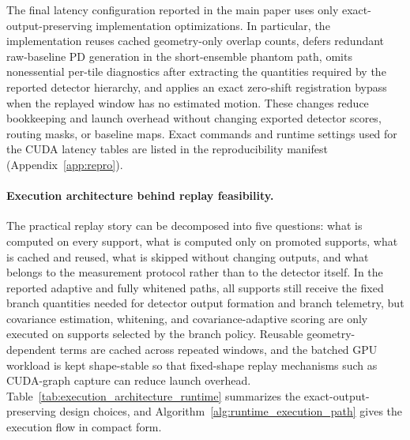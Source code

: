 \documentclass[11pt]{article}
\newif\ifPAPERONLY
\newcommand{\SuppOrApp}[1]{\ifPAPERONLY Supplementary Material\else Appendix~\ref{#1}\fi}
\begin{document}
\noindent The final latency configuration reported in the main paper uses only exact-output-preserving implementation optimizations. In particular, the implementation reuses cached geometry-only overlap counts, defers redundant raw-baseline PD generation in the short-ensemble phantom path, omits nonessential per-tile diagnostics after extracting the quantities required by the reported detector hierarchy, and applies an exact zero-shift registration bypass when the replayed window has no estimated motion. These changes reduce bookkeeping and launch overhead without changing exported detector scores, routing masks, or baseline maps. Exact commands and runtime settings used for the CUDA latency tables are listed in the reproducibility manifest (\SuppOrApp{app:repro}).

\paragraph{Execution architecture behind replay feasibility.}
The practical replay story can be decomposed into five questions: what is computed on every support, what is computed only on promoted supports, what is cached and reused, what is skipped without changing outputs, and what belongs to the measurement protocol rather than to the detector itself. In the reported adaptive and fully whitened paths, all supports still receive the fixed branch quantities needed for detector output formation and branch telemetry, but covariance estimation, whitening, and covariance-adaptive scoring are only executed on supports selected by the branch policy. Reusable geometry-dependent terms are cached across repeated windows, and the batched GPU workload is kept shape-stable so that fixed-shape replay mechanisms such as CUDA-graph capture can reduce launch overhead. Table~\ref{tab:execution_architecture_runtime} summarizes the exact-output-preserving design choices, and Algorithm~\ref{alg:runtime_execution_path} gives the execution flow in compact form.
\end{document}
